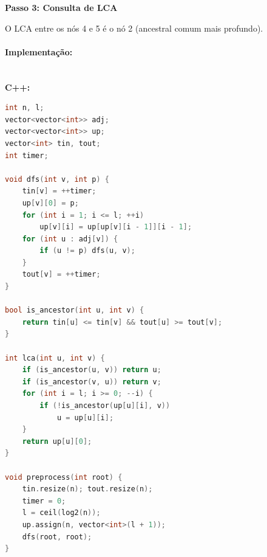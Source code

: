 \hfill
%
\begin{minipage}[t]{0.31\textwidth}
    \centering
    \textbf{Passo 3: Consulta de LCA}\\
    \vspace{0.2cm}

    \vspace{0.2cm}
    \footnotesize
    \raggedright
    O LCA entre os nós 4 e 5 é o nó 2 (ancestral comum mais profundo).
\end{minipage}

\vspace{0.3cm}

\paragraph{Implementação: }\mbox{}\\
\textbf{C++:}
\begin{lstlisting}[language=C++]
int n, l;
vector<vector<int>> adj;
vector<vector<int>> up;
vector<int> tin, tout;
int timer;

void dfs(int v, int p) {
    tin[v] = ++timer;
    up[v][0] = p;
    for (int i = 1; i <= l; ++i)
        up[v][i] = up[up[v][i - 1]][i - 1];
    for (int u : adj[v]) {
        if (u != p) dfs(u, v);
    }
    tout[v] = ++timer;
}

bool is_ancestor(int u, int v) {
    return tin[u] <= tin[v] && tout[u] >= tout[v];
}

int lca(int u, int v) {
    if (is_ancestor(u, v)) return u;
    if (is_ancestor(v, u)) return v;
    for (int i = l; i >= 0; --i) {
        if (!is_ancestor(up[u][i], v))
            u = up[u][i];
    }
    return up[u][0];
}

void preprocess(int root) {
    tin.resize(n); tout.resize(n);
    timer = 0;
    l = ceil(log2(n));
    up.assign(n, vector<int>(l + 1));
    dfs(root, root);
}
\end{lstlisting}
\newpage